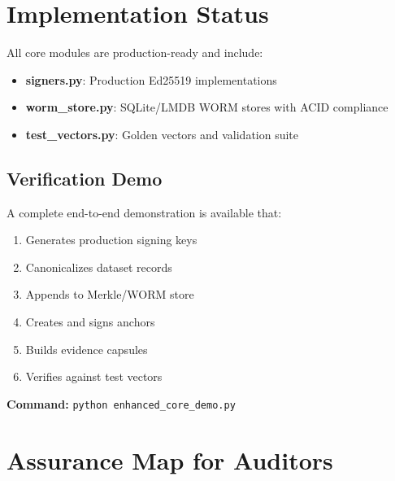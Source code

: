 \documentclass[11pt,a4paper]{article}
\begin{document}
\section{Implementation Status}

All core modules are production-ready and include:

\begin{itemize}
    \item \textbf{signers.py}: Production Ed25519 implementations
    \item \textbf{worm\_store.py}: SQLite/LMDB WORM stores with ACID compliance
    \item \textbf{test\_vectors.py}: Golden vectors and validation suite
\end{itemize}

\subsection{Verification Demo}

A complete end-to-end demonstration is available that:

\begin{enumerate}
    \item Generates production signing keys
    \item Canonicalizes dataset records
    \item Appends to Merkle/WORM store
    \item Creates and signs anchors
    \item Builds evidence capsules
    \item Verifies against test vectors
\end{enumerate}

\textbf{Command:} \texttt{python enhanced\_core\_demo.py}

\section{Assurance Map for Auditors}
\end{document}
